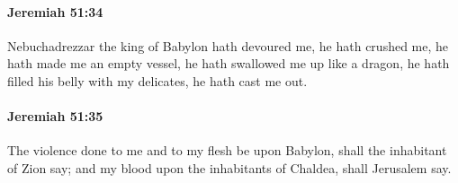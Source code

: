 		\paragraph{Jeremiah 51:34} %
			\label{JEREMIAH-51-34}

			Nebuchadrezzar the king of Babylon hath devoured me, he hath crushed me, he hath made me an empty vessel, he hath swallowed me up like a dragon, he hath filled his belly with my delicates, he hath cast me out.


		\paragraph{Jeremiah 51:35} %
			\label{JEREMIAH-51-35}

			The violence done to me and to my flesh be upon Babylon, shall the inhabitant of Zion say; and my blood upon the inhabitants of Chaldea, shall Jerusalem say.


